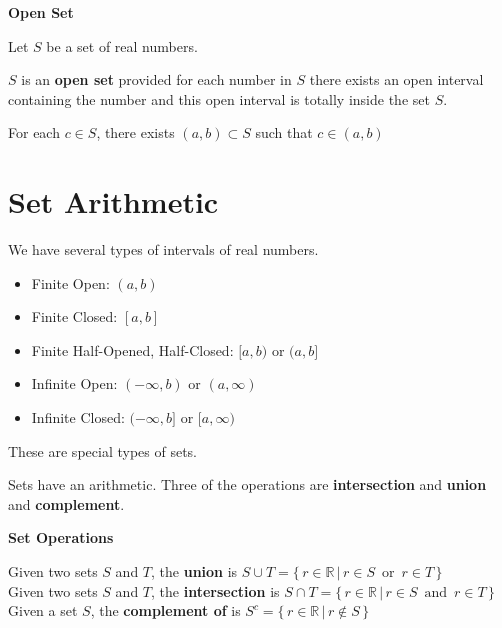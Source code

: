 \documentclass{ximera}
\begin{document}
\begin{definition} \textbf{\textcolor{green!50!black}{Open Set}} 


Let $S$ be a set of real numbers. 

$S$ is an \textbf{open set} provided for each number in $S$ there exists an open interval containing the number and this open interval is totally inside the set $S$.

\begin{center}
For each $c \in S$, there exists $(a,b) \subset S$ such that $c \in (a,b)$
\end{center}

\end{definition}







\section*{Set Arithmetic}


We have several types of intervals of real numbers.


\begin{itemize}
\item Finite Open:   $(a, b)$
\item Finite Closed: $[a, b]$
\item Finite Half-Opened, Half-Closed:  $[a, b)$  or $(a,b]$ 

\item Infinite Open: $(-\infty, b)$ or $(a, \infty)$
\item Infinite Closed: $(-\infty, b]$ or $[a, \infty)$

\end{itemize}

These are special types of sets.


Sets have an arithmetic. Three of the operations are \textbf{intersection} and \textbf{union} and \textbf{complement}.



\begin{definition} \textbf{\textcolor{green!50!black}{Set Operations}} 


Given two sets $S$ and $T$, the \textbf{union} is $S \cup T = \{ \, r \in \mathbb{R} \, | \, r \in S \, \text{ or } \, r \in T  \,   \}$ \\

Given two sets $S$ and $T$, the \textbf{intersection} is $S \cap T = \{ \, r \in \mathbb{R} \, | \, r \in S \, \text{ and } \, r \in T  \,   \}$ \\
 
Given a set $S$, the \textbf{complement of} is $S^{c}  = \{ \, r \in \mathbb{R} \, | \, r \not\in S \,  \}$ 


\end{definition}
\end{document}
